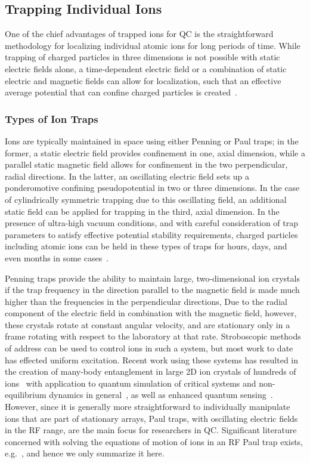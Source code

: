 \documentclass[%
12pt,
 amsmath,amssymb,
]{revtex4-2}
\begin{document}
\subsection{Trapping Individual Ions}

One of the chief advantages of trapped ions for QC is the straightforward methodology for localizing individual atomic ions for long periods of time.  While trapping of charged particles in three dimensions is not possible with static electric fields alone, a time-dependent electric field or a combination of static electric and magnetic fields can allow for localization, such that an effective average potential that can confine charged particles is created~\cite{DEHMELT196853,RevModPhys.62.531}.

\subsubsection{Types of Ion Traps}

Ions are typically maintained in space using either Penning or Paul traps; in the former, a static electric field provides confinement in one, axial dimension, while a parallel static magnetic field allows for confinement in the two perpendicular, radial directions.  In the latter, an oscillating electric field sets up a ponderomotive confining pseudopotential in two or three dimensions.  In the case of cylindrically symmetric trapping due to this oscillating field, an additional static field can be applied for trapping in the third, axial dimension.  In the presence of ultra-high vacuum conditions, and with careful consideration of trap parameters to satisfy effective potential stability requirements, charged particles including atomic ions can be held in these types of traps for hours, days, and even months in some cases~\cite{PhysRevLett.65.1317}.

Penning traps provide the ability to maintain large, two-dimensional ion crystals if the trap frequency in the direction parallel to the magnetic field is made much higher than the frequencies in the perpendicular directions,   Due to the radial component of the electric field in combination with the magnetic field, however, these crystals rotate at constant angular velocity, and are stationary only in a frame rotating with respect to the laboratory at that rate.  Stroboscopic methods of address can be used to control ions in such a system, but most work to date has effected uniform excitation.  Recent work using these systems has resulted in the creation of many-body entanglement in large 2D ion crystals of hundreds of ions~\cite{Britton2012} with application to quantum simulation of critical systems and non-equilibrium dynamics in general~\cite{Garttner2017,PhysRevLett.121.040503}, as well as enhanced quantum sensing~\cite{PhysRevLett.118.263602}.  However, since it is generally more straightforward to individually manipulate ions that are part of stationary arrays, Paul traps, with oscillating electric fields in the RF range, are the main focus for researchers in QC.  Significant literature concerned with solving the equations of motion of ions in an RF Paul trap exists, e.g.~\cite{RevModPhys.62.531,Wineland1998,leibfried2003quantum}, and hence we only summarize it here.
\end{document}
